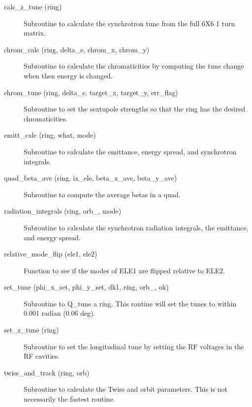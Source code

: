 \begin{description}

\item[calc\_z\_tune (ring)] \Newline
Subroutine to calculate the synchrotron tune from the full 6X6 1 turn matrix. 

\item[chrom\_calc (ring, delta\_e, chrom\_x, chrom\_y)] \Newline
Subroutine to calculate the chromaticities by computing the tune 
change when then energy is changed. 

\item[chrom\_tune (ring, delta\_e, target\_x, target\_y, err\_flag)] \Newline
Subroutine to set the sextupole strengths so that the ring 
has the desired chromaticities. 

\item[emitt\_calc (ring, what, mode)] \Newline
Subroutine to calculate the emittance, energy spread, and synchrotron integrals. 

\item[quad\_beta\_ave (ring, ix\_ele, beta\_x\_ave, beta\_y\_ave)] \Newline
Subroutine to compute the average betas in a quad.

\item[radiation\_integrals (ring, orb\_, mode)] \Newline
Subroutine to calculate the synchrotron radiation integrals, the emittance, and energy spread. 

\item[relative\_mode\_flip (ele1, ele2)] \Newline
Function to see if the modes of ELE1 are flipped relative to ELE2. 

\item[set\_tune (phi\_x\_set, phi\_y\_set, dk1, ring, orb\_, ok)] \Newline
Subroutine to Q\_tune a ring. This routine will set the tunes to within 0.001 radian (0.06 deg). 

\item[set\_z\_tune (ring)] \Newline
Subroutine to set the longitudinal tune by setting the RF voltages in the RF cavities. 

\item[twiss\_and\_track (ring, orb)] \Newline
Subroutine to calculate the Twiss and orbit parameters. 
This is not necessarily the fastest routine. 


\end{description}
